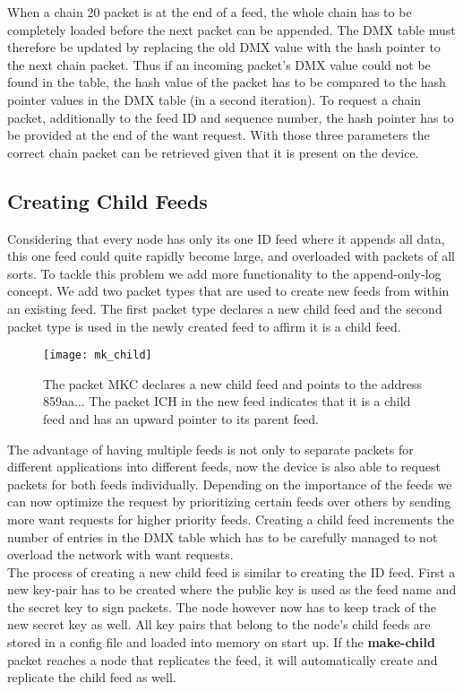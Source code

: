 When a chain 20 packet is at the end of a feed, the whole chain has to be completely loaded before the next packet can be appended. The DMX table must therefore be updated by replacing the old DMX value with the hash pointer to the next chain packet. Thus if an incoming packet's DMX value could not be found in the table, the hash value of the packet has to be compared to the hash pointer values in the DMX table (in a second iteration). To request a chain packet, additionally to the feed ID and sequence number, the hash pointer has to be provided at the end of the want request. With those three parameters the correct chain packet can be retrieved given that it is present on the device. \\


\subsection{Creating Child Feeds}
Considering that every node has only its one ID feed where it appends all data, this one feed could quite rapidly become large, and overloaded with packets of all sorts. To tackle this problem we add more functionality to the append-only-log concept. We add two packet types that are used to create new feeds from within an existing feed. The first packet type declares a new child feed and the second packet type is used in the newly created feed to affirm it is a child feed.

\begin{figure}
\centering
\texttt{[image: mk\_child]}
\caption{The packet MKC declares a new child feed and points to the address 859aa... The packet ICH in the new feed indicates that it is a child feed and has an upward pointer to its parent feed.}
\label{fig:mk_child}
\end{figure}

The advantage of having multiple feeds is not only to separate packets for different applications into different feeds, now the device is also able to request packets for both feeds individually. Depending on the importance of the feeds we can now optimize the request by prioritizing certain feeds over others by sending more want requests for higher priority feeds. Creating a child feed increments the number of entries in the DMX table which has to be carefully managed to not overload the network with want requests. \\
The process of creating a new child feed is similar to creating the ID feed. First a new key-pair has to be created where the public key is used as the feed name and the secret key to sign packets. The node however now has to keep track of the new secret key as well. All key pairs that belong to the node's child feeds are stored in a config file and loaded into memory on start up. If the \textbf{make-child} packet reaches a node that replicates the feed, it will automatically create and replicate the child feed as well.

